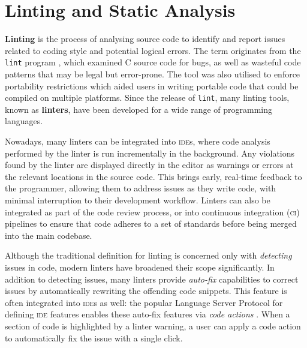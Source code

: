 \section{Linting and Static Analysis}



\textbf{Linting} is the process of analysing source code to identify and report issues related to coding style and potential logical errors.
The term originates from the \texttt{lint} program \cite{johnson_lint_1978}, which examined C source code for bugs, as well as wasteful code patterns that may be legal but error-prone.
The tool was also utilised to enforce portability restrictions which aided users in writing portable code that could be compiled on multiple platforms.
Since the release of \texttt{lint}, many linting tools, known as \textbf{linters}, have been developed for a wide range of programming languages.

Nowadays, many linters can be integrated into \textsc{ide}s, where code analysis performed by the linter is run incrementally in the background.
Any violations found by the linter are displayed directly in the editor as warnings or errors at the relevant locations in the source code.
This brings early, real-time feedback to the programmer, allowing them to address issues as they write code, with minimal interruption to their development workflow.
Linters can also be integrated as part of the code review process, or into continuous integration (\textsc{ci}) pipelines to ensure that code adheres to a set of standards before being merged into the main codebase.

Although the traditional definition for linting is concerned only with \emph{detecting} issues in code, modern linters have broadened their scope significantly.
In addition to detecting issues, many linters provide \emph{auto-fix} capabilities to correct issues by automatically rewriting the offending code snippets.
This feature is often integrated into \textsc{ide}s as well: the popular Language Server Protocol for defining \textsc{ide} features enables these auto-fix features via \emph{code actions} \cite{gunasinghe_lsp_2022}.
When a section of code is highlighted by a linter warning, a user can apply a code action to automatically fix the issue with a single click.

